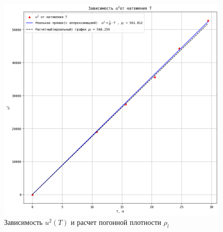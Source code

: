 \documentclass[a4paper]{article}
\begin{document}
\begin{figure}[t]
    \centering
    \includegraphics[width=1\textwidth]{graphic2.png}
    \caption{Зависимость $u^2(T)$ и расчет погонной плотности $\rho_{l}$}
\end{figure}
\end{document}

